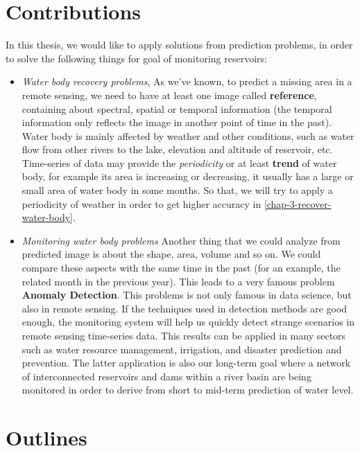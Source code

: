 \section{Contributions} %

In this thesis, we would like to apply solutions from prediction problems, in order to solve the following things for goal of monitoring reservoirs:

\begin{itemize}
	\item \textit{Water body recovery problems}, As we've known, to predict a missing area in a remote sensing, we need to have at least one image called \textbf{reference}, containing about spectral, spatial or temporal information  (the temporal information only reflects the image in another point of time in the past). Water body is mainly affected by weather and other conditions, such as water flow from other rivers to the lake, elevation and altitude of reservoir, etc. Time-series of data may provide the \textit{periodicity} or at least \textbf{trend} of water body, for example its area is increasing or decreasing, it usually has a large or small area of water body in some months. So that, we will try to apply a periodicity of weather in order to get higher accuracy in \ref{chap-3-recover-water-body}.

	\item \textit{Monitoring water body problems} Another thing that we could analyze from predicted image is about the shape, area, volume and so on. We could compare these aspects with the same time in the past (for an example, the related month in the previous year). This leads to a very famous problem \textbf{Anomaly Detection}. This problems is not only famous in data science, but also in remote sensing\cite{Grosklos2015,Yang2019}. If the techniques used in detection methods are good enough, the monitoring system will help us quickly detect strange scenarios in remote sensing time-series data. This results can be applied in many sectors such as water resource management, irrigation, and disaster prediction and prevention. The latter application is also our long-term goal where a network of interconnected reservoirs and dams  within a river basin are being monitored in order to derive from short to mid-term prediction of water level.
\end{itemize}


\section{Outlines} 

